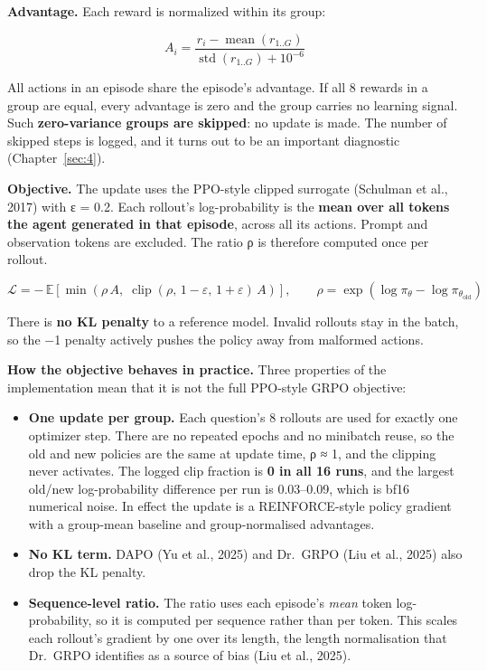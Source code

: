 \textbf{Advantage.} Each reward is normalized within its group:

\[
A_i = \frac{r_i - \operatorname{mean}(r_{1..G})}{\operatorname{std}(r_{1..G}) + 10^{-6}}
\]

All actions in an episode share the episode's advantage. If all 8
rewards in a group are equal, every advantage is zero and the group
carries no learning signal. Such \textbf{zero-variance groups are
skipped}: no update is made. The number of skipped steps is logged, and
it turns out to be an important diagnostic (Chapter~\ref{sec:4}).

\textbf{Objective.} The update uses the PPO-style clipped surrogate
(Schulman et al., 2017) with ε = 0.2. Each rollout's log-probability is
the \textbf{mean over all tokens the agent generated in that episode},
across all its actions. Prompt and observation tokens are excluded. The
ratio ρ is therefore computed once per rollout.

\[
\mathcal{L} = -\,\mathbb{E}\left[\min\left(\rho\,A,\; \operatorname{clip}(\rho,\,1-\varepsilon,\,1+\varepsilon)\,A\right)\right],
\qquad \rho = \exp\left(\log\pi_\theta - \log\pi_{\theta_\text{old}}\right)
\]

There is \textbf{no KL penalty} to a reference model. Invalid rollouts
stay in the batch, so the −1 penalty actively pushes the policy away
from malformed actions.

\textbf{How the objective behaves in practice.} Three properties of the
implementation mean that it is not the full PPO-style GRPO objective:

\begin{itemize}
\tightlist
\item
  \textbf{One update per group.} Each question's 8 rollouts are used for
  exactly one optimizer step. There are no repeated epochs and no
  minibatch reuse, so the old and new policies are the same at update
  time, ρ ≈ 1, and the clipping never activates. The logged clip
  fraction is \textbf{0 in all 16 runs}, and the largest old/new
  log-probability difference per run is 0.03--0.09, which is bf16
  numerical noise. In effect the update is a REINFORCE-style policy
  gradient with a group-mean baseline and group-normalised advantages.
\item
  \textbf{No KL term.} DAPO (Yu et al., 2025) and Dr.~GRPO (Liu et al.,
  2025) also drop the KL penalty.
\item
  \textbf{Sequence-level ratio.} The ratio uses each episode's
  \emph{mean} token log-probability, so it is computed per sequence
  rather than per token. This scales each rollout's gradient by one over
  its length, the length normalisation that Dr.~GRPO identifies as a
  source of bias (Liu et al., 2025).
\end{itemize}

